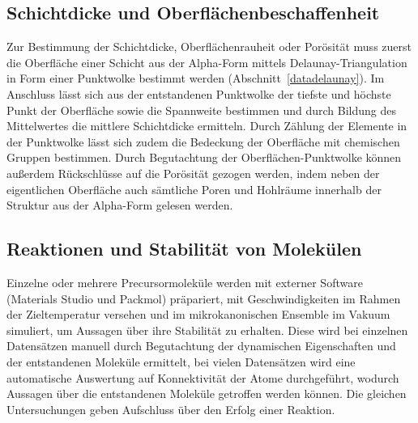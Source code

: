 \subsection{Schichtdicke und Oberflächenbeschaffenheit}
\label{mdmethods-surface}

Zur Bestimmung der Schichtdicke, Oberflächenrauheit oder Porösität muss zuerst die Oberfläche einer Schicht aus der Alpha-Form mittels Delaunay-Triangulation in Form einer Punktwolke bestimmt werden (Abschnitt~\ref{datadelaunay}).
Im Anschluss lässt sich aus der entstandenen Punktwolke der tiefste und höchste Punkt der Oberfläche sowie die Spannweite bestimmen und durch Bildung des Mittelwertes die mittlere Schichtdicke ermitteln.
Durch Zählung der Elemente in der Punktwolke lässt sich zudem die Bedeckung der Oberfläche mit chemischen Gruppen bestimmen.
Durch Begutachtung der Oberflächen-Punktwolke können außerdem Rückschlüsse auf die Porösität gezogen werden, indem neben der eigentlichen Oberfläche auch sämtliche Poren und Hohlräume innerhalb der Struktur aus der Alpha-Form gelesen werden.

\subsection{Reaktionen und Stabilität von Molekülen}

Einzelne oder mehrere Precursormoleküle werden mit externer Software (Materials Studio\cite{biovia_materials_2014} und Packmol) präpariert, mit Geschwindigkeiten im Rahmen der Zieltemperatur versehen und im mikrokanonischen Ensemble im Vakuum simuliert, um Aussagen über ihre Stabilität zu erhalten.
Diese wird bei einzelnen Datensätzen manuell durch Begutachtung der dynamischen Eigenschaften und der entstandenen Moleküle ermittelt, bei vielen Datensätzen wird eine automatische Auswertung auf Konnektivität der Atome durchgeführt, wodurch Aussagen über die entstandenen Moleküle getroffen werden können.
Die gleichen Untersuchungen geben Aufschluss über den Erfolg einer Reaktion.
